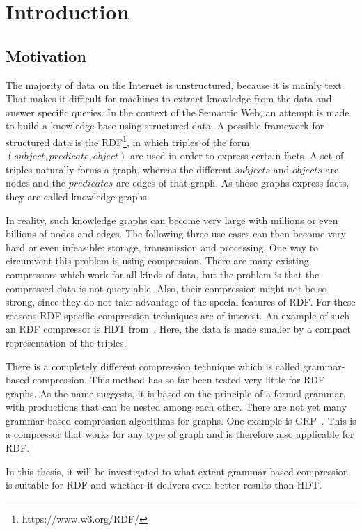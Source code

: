 \chapter{Introduction}\label{ch:introduction}

\section{Motivation}
The majority of data on the Internet is unstructured, because it is mainly text. That makes it difficult for machines to extract knowledge from the data and answer specific queries. In the context of the Semantic Web, an attempt is made to build a knowledge base using structured data. A possible framework for structured data is the \ac{RDF}\footnote{https://www.w3.org/RDF/}, in which triples of the form $ (subject, predicate, object) $ are used in order to express certain facts. A set of triples naturally forms a graph, whereas the different $subjects$ and $objects$ are nodes and the $predicates$ are edges of that graph. As those graphs express facts, they are called knowledge graphs.

In reality, such knowledge graphs can become very large with millions or even billions of nodes and edges. The following three use cases can then become very hard or even infeasible: storage, transmission and processing. One way to circumvent this problem is using compression. There are many existing compressors which work for all kinds of data, but the problem is that the compressed data is not query-able. Also, their compression might not be so strong, since they do not take advantage of the special features of RDF. For these reasons RDF-specific compression techniques are of interest. An example of such an RDF compressor is \ac{HDT} from~\cite{hdt}. Here, the data is made smaller by a compact representation of the triples. 

There is a completely different compression technique which is called grammar-based compression. This method has so far been tested very little for RDF graphs. As the name suggests, it is based on the principle of a formal grammar, with productions that can be nested among each other. There are not yet many grammar-based compression algorithms for graphs. One example is \ac{GRP}~\cite{maneth}. This is a compressor that works for any type of graph and is therefore also applicable for RDF.

In this thesis, it will be investigated to what extent grammar-based compression is suitable for RDF and whether it delivers even better results than HDT.

